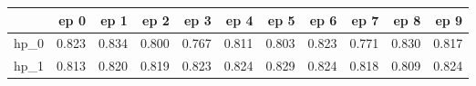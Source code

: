 \begin{tabular}{lrrrrrrrrrr}
\toprule
{} &   ep 0 &   ep 1 &   ep 2 &   ep 3 &   ep 4 &   ep 5 &   ep 6 &   ep 7 &   ep 8 &   ep 9 \\
\midrule
hp\_0 &  0.823 &  0.834 &  0.800 &  0.767 &  0.811 &  0.803 &  0.823 &  0.771 &  0.830 &  0.817 \\
hp\_1 &  0.813 &  0.820 &  0.819 &  0.823 &  0.824 &  0.829 &  0.824 &  0.818 &  0.809 &  0.824 \\
\bottomrule
\end{tabular}
